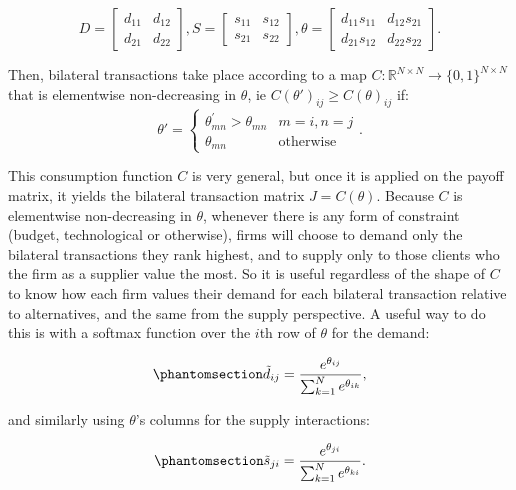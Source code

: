 \documentclass[
]{article}
\theoremstyle{definition}
\theoremstyle{plain}
\theoremstyle{remark}
\begin{document}
\[
D = 
\begin{bmatrix}
d_{11} & d_{12} \\
d_{21} & d_{22}
\end{bmatrix}
,
S = 
\begin{bmatrix}
s_{11} & s_{12} \\
s_{21} & s_{22}
\end{bmatrix}
,
\theta = 
\begin{bmatrix}
d_{11}s_{11} & d_{12}s_{21} \\
d_{21}s_{12} & d_{22}s_{22}
\end{bmatrix}.
\]

Then, bilateral transactions take place according to a map
\(C : \mathbb{R}^{N \times N} \to \{0, 1\}^{N \times N}\) that is
elementwise non-decreasing in \(\theta\), ie
\(C(\theta')_{ij} \geq C(\theta)_{ij}\) if: \[
\theta' = \begin{cases} \theta_{mn}^{'} > \theta_{mn} & m=i, n=j\\ \theta_{mn} & \text{otherwise} \end{cases}.
\]

This consumption function \(C\) is very general, but once it is applied
on the payoff matrix, it yields the bilateral transaction matrix
\(J = C(\theta)\). Because \(C\) is elementwise non-decreasing in
\(\theta\), whenever there is any form of constraint (budget,
technological or otherwise), firms will choose to demand only the
bilateral transactions they rank highest, and to supply only to those
clients who the firm as a supplier value the most. So it is useful
regardless of the shape of \(C\) to know how each firm values their
demand for each bilateral transaction relative to alternatives, and the
same from the supply perspective. A useful way to do this is with a
softmax function over the \(i\)th row of \(\theta\) for the demand:

\begin{equation}\phantomsection\label{eq-softmaxrow}{
\tilde{d}_{ij} = \frac{e^{\theta_{ij}}}{\sum_{k=1}^N e^{\theta_{ik}}},
}\end{equation}

and similarly using \(\theta\)'s columns for the supply interactions:

\begin{equation}\phantomsection\label{eq-softmaxcol}{
\tilde{s}_{ji} = \frac{e^{\theta_{ji}}}{\sum_{k=1}^N e^{\theta_{ki}}}.
}\end{equation}
\end{document}
